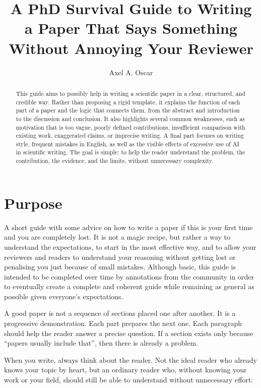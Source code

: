 \documentclass[11pt,a4paper]{article}
\title{A PhD Survival Guide to Writing a Paper That Says Something Without Annoying Your Reviewer}
\author{Axel A. Oscar}
\date{}
\theoremstyle{definition}
\begin{document}
\maketitle

\begin{abstract}
This guide aims to possibly help in writing a scientific paper in a clear, structured, and credible way. Rather than proposing a rigid template, it explains the function of each part of a paper and the logic that connects them, from the abstract and introduction to the discussion and conclusion. It also highlights several common weaknesses, such as motivation that is too vague, poorly defined contributions, insufficient comparison with existing work, exaggerated claims, or imprecise writing. A final part focuses on writing style, frequent mistakes in English, as well as the visible effects of excessive use of AI in scientific writing. The goal is simple: to help the reader understand the problem, the contribution, the evidence, and the limits, without unnecessary complexity.
\end{abstract}

\tableofcontents

\section{Purpose}

A short guide with some advice on how to write a paper if this is your first time and you are completely lost. It is not a magic recipe, but rather a way to understand the expectations, to start in the most effective way, and to allow your reviewers and readers to understand your reasoning without getting lost or penalising you just because of small mistakes. Although basic, this guide is intended to be completed over time by annotations from the community in order to eventually create a complete and coherent guide while remaining as general as possible given everyone's expectations.

A good paper is not a sequence of sections placed one after another. It is a progressive demonstration. Each part prepares the next one. Each paragraph should help the reader answer a precise question. If a section exists only because ``papers usually include that'', then there is already a problem.

When you write, always think about the reader. Not the ideal reader who already knows your topic by heart, but an ordinary reader who, without knowing your work or your field, should still be able to understand without unnecessary effort:
\end{document}
